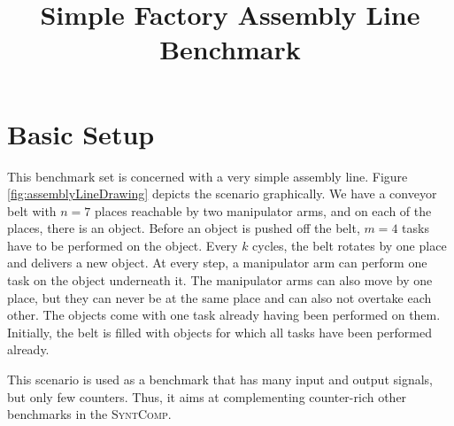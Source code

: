 \documentclass[a4paper,10pt]{IEEEtran}
\author{\IEEEauthorblockN{R\"udiger Ehlers \\}
\IEEEauthorblockA{University of Bremen \& DFKI GmbH\\
Germany
}}
\newcommand{\SyntComp}{\textsc{SyntComp}}
\begin{document}
\title{Simple Factory Assembly Line Benchmark}
\maketitle

\section{Basic Setup}
%
\noindent This benchmark set is concerned with a very simple assembly line. Figure \ref{fig:assemblyLineDrawing} depicts the scenario graphically. We have a conveyor belt with $n=7$ places reachable by two manipulator arms, and on each of the places, there is an object. Before an object is pushed off the belt, $m=4$ tasks have to be performed on the object. Every $k$ cycles, the belt rotates by one place and delivers a new object. At every step, a manipulator arm can perform one task on the object underneath it. The manipulator arms can also move by one place, but they can never be at the same place and can also not overtake each other. The objects come with one task already having been performed on them. Initially, the belt is filled with objects for which all tasks have been performed already.


This scenario is used as a benchmark that has many input and output signals, but only few counters. Thus, it aims at complementing counter-rich other benchmarks in the \SyntComp.
\end{document}
